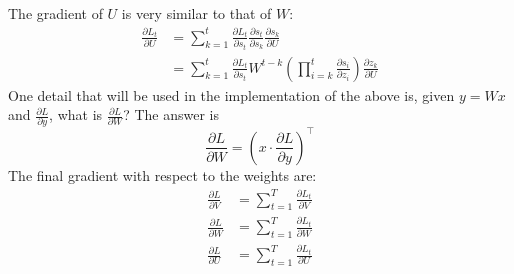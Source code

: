 \documentclass{article}
\begin{document}
The gradient of $U$ is very similar to that of $W$:
\begin{align}
    \frac{\partial L_t}{\partial U} &= \sum_{k=1}^t \frac{\partial L_t}{\partial s_t}\frac{\partial s_t}{\partial s_k}\frac{\partial s_k}{\partial U} \\
    &= \sum_{k=1}^t\frac{\partial L_t}{\partial s_t}W^{t-k}\left(\prod_{i=k}^t\frac{\partial s_i}{\partial z_i}\right)\frac{\partial z_k}{\partial U}
\end{align}
One detail that will be used in the implementation of the above is, given $y = Wx$ and $\frac{\partial L}{\partial y}$, what is $\frac{\partial L}{\partial W}$? The answer is
\begin{equation}
   \frac{\partial L}{\partial W} = (x\cdot\frac{\partial L}{\partial y})^\top  
\end{equation}
The final gradient with respect to the weights are:
\begin{align}
    \frac{\partial L}{\partial V} &= \sum_{t=1}^T\frac{\partial L_t}{\partial V} \\
    \frac{\partial L}{\partial W} &= \sum_{t=1}^T\frac{\partial L_t}{\partial W} \\
    \frac{\partial L}{\partial U} &= \sum_{t=1}^T\frac{\partial L_t}{\partial U}
\end{align}
\end{document}
